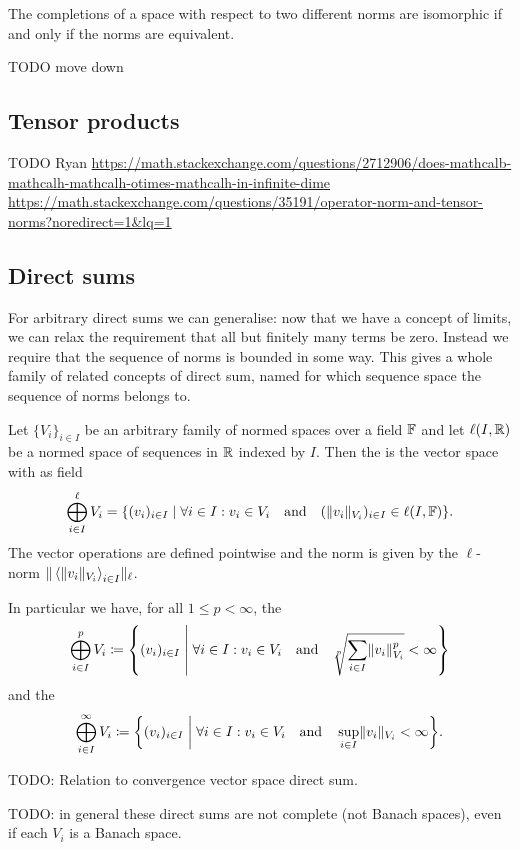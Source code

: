 \begin{proposition}
The completions of a space with respect to two different norms are isomorphic \textup{if and only if} the norms are equivalent.
\end{proposition}

TODO move down
\subsection{Tensor products}
TODO Ryan
\url{https://math.stackexchange.com/questions/2712906/does-mathcalb-mathcalh-mathcalh-otimes-mathcalh-in-infinite-dime}
\url{https://math.stackexchange.com/questions/35191/operator-norm-and-tensor-norms?noredirect=1&lq=1}

\subsection{Direct sums}

For arbitrary direct sums we can generalise: now that we have a concept of limits, we can relax the requirement that all but finitely many terms be zero. Instead we require that the sequence of norms is bounded in some way. This gives a whole family of related concepts of direct sum, named for which sequence space the sequence of norms belongs to.
\begin{definition}
Let $\{V_i\}_{i\in I}$ be an arbitrary family of normed spaces over a field $\mathbb{F}$ and let $\ell(I,\mathbb{R})$ be a normed space of sequences in $\mathbb{R}$ indexed by $I$. Then the  is the vector space with as field
\[ \bigoplus_{i\in I}^\ell V_i = \setbuilder{(v_i)_{i\in I}}{\forall i\in I: v_i\in V_i \quad\text{and}\quad (\norm{v_i}_{V_i})_{i\in I}\in \ell(I,\F) }. \]
The vector operations are defined pointwise and the norm is given by the $\ell$-norm $\lVert\big. \left\langle \lVert v_i\rVert_{V_i} \right\rangle_{i\in I}\rVert_\ell$.

In particular we have, for all $1\leq p<\infty$, the 
\[ \bigoplus_{i\in I}^p V_i \defeq \setbuilder{(v_i)_{i\in I}}{\forall i\in I: v_i\in V_i \quad\text{and}\quad \sqrt[p]{\sum_{i\in I}\norm{v_i}_{V_i}^p}<\infty} \]
and the 
\[ \bigoplus_{i\in I}^\infty V_i \defeq \setbuilder{(v_i)_{i\in I}}{\forall i\in I: v_i\in V_i \quad\text{and}\quad \sup_{i\in I}\norm{v_i}_{V_i}<\infty}. \]
\end{definition}

TODO: Relation to convergence vector space direct sum.

TODO: in general these direct sums are not complete (not Banach spaces), even if each $V_i$ is a Banach space.

